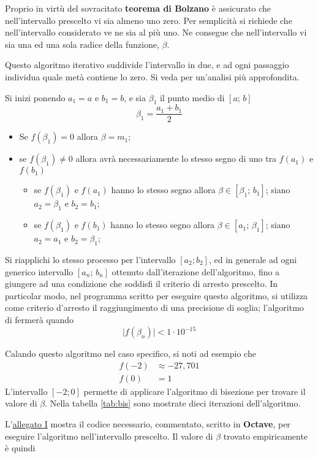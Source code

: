 Proprio in virtù del sovracitato \textbf{teorema di Bolzano} \parencite[vol. 4B, p. 1436]{blu:1}
è assicurato che nell'intervallo prescelto vi sia almeno uno zero. Per semplicità si richiede che nell'intervallo considerato ve ne sia al più uno. Ne consegue che nell'intervallo vi sia una ed una sola radice della funzione, $\beta$.

Questo algoritmo iterativo suddivide l'intervallo in due, e ad ogni passaggio individua quale metà contiene lo zero. Si veda \parencite[48-53]{num:an} per un'analisi più approfondita.

Si inizi ponendo $a_1=a$ e $b_1=b$, e sia $\beta_1$ il punto medio di $[a;\,b]$
\[
\beta_1=\frac{a_1+b_1}{2}
\]
\begin{itemize}
\item Se $f(\beta_1)=0$ allora $\beta=m_1$;
\item se $f(\beta_1)\neq0$ allora avrà necessariamente lo stesso segno di uno tra $f(a_1)$ e $f(b_1)$
\begin{itemize}
\item  se $f(\beta_1)$ e $f(a_1)$ hanno lo stesso segno allora $\beta\in [\beta_1;\,b_1]$; siano $a_2=\beta_1$ e $b_2=b_1$;
\item  se $f(\beta_1)$ e $f(b_1)$ hanno lo stesso segno allora $\beta\in [a_1;\,\beta_1]$; siano $a_2=a_1$ e $b_2=\beta_1$;
\end{itemize}
\end{itemize}
Si riapplichi lo stesso processo per l'intervallo $[a_2; b_2]$, ed in generale ad ogni generico intervallo $[a_n;\,b_n]$ ottenuto dall'iterazione dell'algoritmo, fino a giungere ad una condizione che soddisfi il criterio di arresto prescelto. In particolar modo, nel programma scritto per eseguire questo algoritmo, si utilizza come criterio d'arresto il raggiungimento di una precisione di soglia; l'algoritmo di fermerà quando
\[
\big|f(\beta_n)\big|<1\cdot 10^{-15}
\]

Calando questo algoritmo nel caso specifico, si noti ad esempio che 
\begin{align*}
f(-2)&\approx-27,701\\
f(0)&=1
\end{align*}
L'intervallo $[-2; 0]$ permette di applicare l'algoritmo di bisezione per trovare il valore di $\beta$. Nella tabella \ref{tab:bis} sono mostrate dieci iterazioni dell'algoritmo.

L'\hyperref[all:1]{allegato I} mostra il codice necessario, commentato, scritto in \textbf{Octave}, per eseguire l'algoritmo nell'intervallo prescelto. Il valore di $\beta$ trovato empiricamente è quindi

